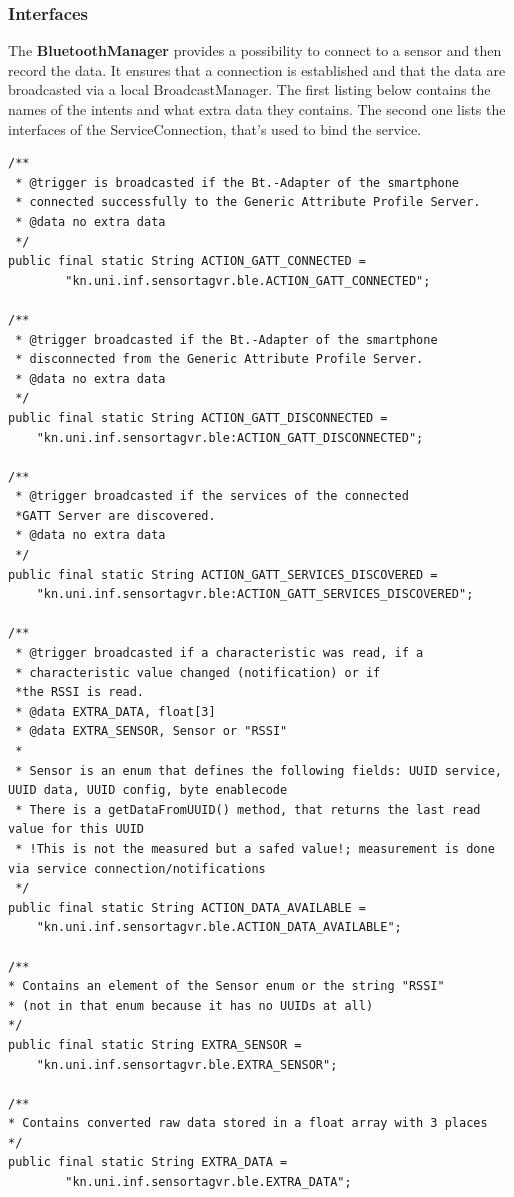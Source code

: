 \subsubsection{Interfaces}
The \textbf{BluetoothManager} provides a possibility to connect to a sensor and then record
the data. It ensures that a connection is established and that the data are broadcasted via a local BroadcastManager. The first listing below contains the names of the intents and what extra data they contains. The second one lists the interfaces of the ServiceConnection, that's used to bind the service. \\
\begin{lstlisting}
/**
 * @trigger is broadcasted if the Bt.-Adapter of the smartphone
 * connected successfully to the Generic Attribute Profile Server.
 * @data no extra data
 */
public final static String ACTION_GATT_CONNECTED =
        "kn.uni.inf.sensortagvr.ble.ACTION_GATT_CONNECTED";

/**
 * @trigger broadcasted if the Bt.-Adapter of the smartphone
 * disconnected from the Generic Attribute Profile Server.
 * @data no extra data
 */
public final static String ACTION_GATT_DISCONNECTED =
    "kn.uni.inf.sensortagvr.ble:ACTION_GATT_DISCONNECTED";

/**
 * @trigger broadcasted if the services of the connected
 *GATT Server are discovered.
 * @data no extra data
 */
public final static String ACTION_GATT_SERVICES_DISCOVERED =
    "kn.uni.inf.sensortagvr.ble:ACTION_GATT_SERVICES_DISCOVERED";

/**
 * @trigger broadcasted if a characteristic was read, if a
 * characteristic value changed (notification) or if
 *the RSSI is read.
 * @data EXTRA_DATA, float[3]
 * @data EXTRA_SENSOR, Sensor or "RSSI"
 *
 * Sensor is an enum that defines the following fields: UUID service, UUID data, UUID config, byte enablecode
 * There is a getDataFromUUID() method, that returns the last read value for this UUID
 * !This is not the measured but a safed value!; measurement is done via service connection/notifications
 */
public final static String ACTION_DATA_AVAILABLE =
    "kn.uni.inf.sensortagvr.ble.ACTION_DATA_AVAILABLE";

/**
* Contains an element of the Sensor enum or the string "RSSI"
* (not in that enum because it has no UUIDs at all)
*/
public final static String EXTRA_SENSOR =
    "kn.uni.inf.sensortagvr.ble.EXTRA_SENSOR";

/**
* Contains converted raw data stored in a float array with 3 places
*/
public final static String EXTRA_DATA =
        "kn.uni.inf.sensortagvr.ble.EXTRA_DATA";
\end{lstlisting}
